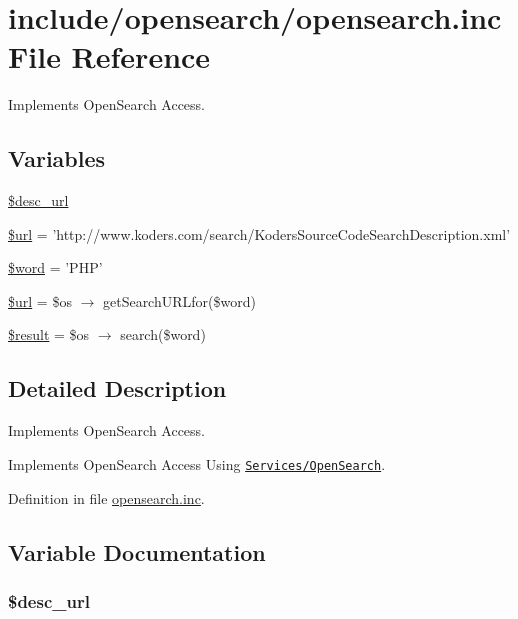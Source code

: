 \hypertarget{opensearch_8inc}{
\section{include/opensearch/opensearch.inc File Reference}
\label{opensearch_8inc}
}
Implements OpenSearch Access. 

\subsection*{Variables}
\begin{CompactItemize}
\item 
\hyperlink{opensearch_8inc_d8176300aa68008fef9a9ddfc3c1a2d5}{\$desc\_\-url}
\item 
\hyperlink{opensearch_8inc_cf215f34a917d014776ce684a9ee8909}{\$url} = 'http://www.koders.com/search/KodersSourceCodeSearchDescription.xml'
\item 
\hyperlink{opensearch_8inc_5d7b6a696c068811c70679ceb91ecc93}{\$word} = 'PHP'
\item 
\hyperlink{opensearch_8inc_cf215f34a917d014776ce684a9ee8909}{\$url} = \$os $\rightarrow$ getSearchURLfor(\$word)
\item 
\hyperlink{opensearch_8inc_112ef069ddc0454086e3d1e6d8d55d07}{\$result} = \$os $\rightarrow$ search(\$word)
\end{CompactItemize}


\subsection{Detailed Description}
Implements OpenSearch Access. 

Implements OpenSearch Access Using \href{http://pear.php.net/package/Services_OpenSearch/}{\tt Services/OpenSearch}. 

Definition in file \hyperlink{opensearch_8inc-source}{opensearch.inc}.

\subsection{Variable Documentation}
\hypertarget{opensearch_8inc_d8176300aa68008fef9a9ddfc3c1a2d5}{
\subsubsection{\setlength{\rightskip}{0pt plus 5cm}\$desc\_\-url}}
\label{opensearch_8inc_d8176300aa68008fef9a9ddfc3c1a2d5}


